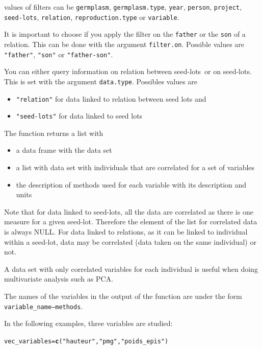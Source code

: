 \documentclass{article}\usepackage[]{graphicx}\usepackage[]{color}
\makeatletter
\newcommand{\hlstr}[1]{\textcolor[rgb]{0.192,0.494,0.8}{#1}}%
\newcommand{\hlstd}[1]{\textcolor[rgb]{0.345,0.345,0.345}{#1}}%
\newcommand{\hlkwb}[1]{\textcolor[rgb]{0.69,0.353,0.396}{#1}}%
\newcommand{\hlkwd}[1]{\textcolor[rgb]{0.737,0.353,0.396}{\textbf{#1}}}%
\newenvironment{kframe}{%
 \def\at@end@of@kframe{}%
 \ifinner\ifhmode%
  \def\at@end@of@kframe{\end{minipage}}%
  \begin{minipage}{\columnwidth}%
 \fi\fi%
 \def\FrameCommand##1{\hskip\@totalleftmargin \hskip-\fboxsep
 \colorbox{shadecolor}{##1}\hskip-\fboxsep
     \hskip-\linewidth \hskip-\@totalleftmargin \hskip\columnwidth}%
 \MakeFramed {\advance\hsize-\width
   \@totalleftmargin\z@ \linewidth\hsize
   \@setminipage}}%
 {\par\unskip\endMakeFramed%
 \at@end@of@kframe}
\newenvironment{knitrout}{}{} %
\renewcommand{\sl}{seed-lots}
\makeatother
\begin{document}
values of filters can be \texttt{germplasm}, \texttt{germplasm.type}, \texttt{year}, \texttt{person}, \texttt{project}, \texttt{\sl}, \texttt{relation}, \texttt{reproduction.type} or \texttt{variable}.


It is important to choose if you apply the filter on the \texttt{father} or the \texttt{son} of a relation.
This can be done with the argument \texttt{filter.on}.
Possible values are \texttt{"father"}, \texttt{"son"} or \texttt{"father-son"}.


You can either query information on relation between \sl~or on \sl.
This is set with the argument \texttt{data.type}.
Possibles values are 

\begin{itemize}
\item \texttt{"relation"} for data linked to relation between seed lots and 
\item \texttt{"seed-lots"} for data linked to seed lots
\end{itemize}


The function returns a list with
\begin{itemize}
\item a data frame with the data set
\item a list with data set with individuals that are correlated for a set of variables
\item the description of methods used for each variable with its description and units
\end{itemize}

Note that for data linked to seed-lots, all the data are correlated as there is one measure for a given seed-lot. 
Therefore the element of the list for correlated data is always NULL.
For data linked to relations, as it can be linked to individual within a seed-lot, data may be correlated (data taken on the same individual) or not.

A data set with only correlated variables for each individual is useful when doing multivariate analysis such as PCA.

The names of the variables in the output of the function are under the form \texttt{variable\_name---methods}.

\vspace{.5cm}

In the following examples, three variables are studied:

\begin{knitrout}
\color{fgcolor}\begin{kframe}
\begin{alltt}
\hlstd{vec_variables} \hlkwb{=} \hlkwd{c}\hlstd{(}\hlstr{"hauteur"}\hlstd{,} \hlstr{"pmg"}\hlstd{,} \hlstr{"poids_epis"}\hlstd{)}
\end{alltt}
\end{kframe}
\end{knitrout}
\end{document}
